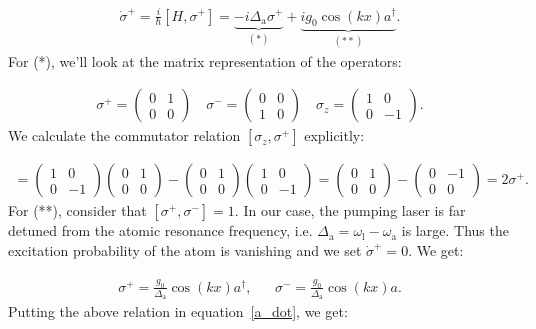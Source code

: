 \begin{align}
\dot{\sigma}^+ = \frac{i}{\hbar} [H, \sigma^+] = \underbrace{-i \Delta_\text{a} \sigma^+}_{(*)} + \underbrace{i g_0 \cos(kx) a^\dagger}_{(**)}.
\end{align}For (*), we'll look at the matrix representation of the operators:

\begin{align}
\sigma^+ = \begin{pmatrix}0 & 1 \\ 0 & 0\end{pmatrix} \quad \sigma^- = \begin{pmatrix}0 & 0 \\ 1 & 0\end{pmatrix} \quad \sigma_z = \begin{pmatrix}1 & 0 \\ 0 & -1\end{pmatrix}.
\end{align}We calculate the commutator relation $[\sigma_z, \sigma^+]$ explicitly:

\begin{align}
[\sigma_z, \sigma^+] = \begin{pmatrix}1 & 0 \\ 0 & -1\end{pmatrix} \begin{pmatrix}0 & 1 \\ 0 & 0\end{pmatrix} - \begin{pmatrix}0 & 1 \\ 0 & 0\end{pmatrix} \begin{pmatrix}1 & 0 \\ 0 & -1\end{pmatrix} = \begin{pmatrix}0 & 1 \\ 0 & 0\end{pmatrix} - \begin{pmatrix}0 & -1 \\ 0 & 0\end{pmatrix} = 2\sigma^+.
\end{align}For (**), consider that $[\sigma^+, \sigma^-] = 1$. In our case, the pumping laser is far detuned from the atomic resonance frequency, i.e. $\Delta_\text{a} = \omega_\text{l} - \omega_\text{a}$ is large. Thus the excitation probability of the atom is vanishing and we set $\dot{\sigma}^+ = 0$. We get:

\begin{align}
\sigma^+ = \frac{g_0 }{\Delta_\text{a}} \cos(kx) a^\dagger, && \sigma^- = \frac{g_0 }{\Delta_\text{a}} \cos(kx) a.
\end{align}Putting the above relation in equation~\ref{a_dot}, we get:


